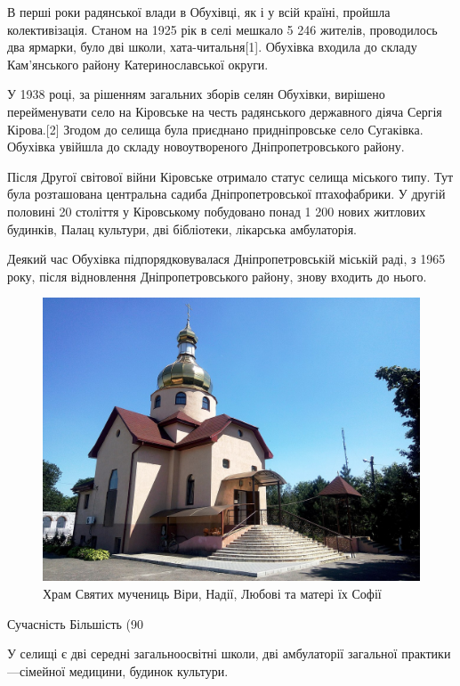В перші роки радянської влади в Обухівці, як і у всій країні, пройшла колективізація. Станом на 1925 рік в селі мешкало 5 246 жителів, проводилось два ярмарки, було дві школи, хата-читальня[1]. Обухівка входила до складу Кам'янського району Катеринославської округи.

У 1938 році, за рішенням загальних зборів селян Обухівки, вирішено перейменувати село на Кіровське на честь радянського державного діяча Сергія Кірова.[2] Згодом до селища була приєднано придніпровське село Сугаківка. Обухівка увійшла до складу новоутвореного Дніпропетровського району.

Після Другої світової війни Кіровське отримало статус селища міського типу. Тут була розташована центральна садиба Дніпропетровської птахофабрики. У другій половині 20 століття у Кіровському побудовано понад 1 200 нових житлових будинків, Палац культури, дві бібліотеки, лікарська амбулаторія.

Деякий час Обухівка підпорядковувалася Дніпропетровській міській раді, з 1965 року, після відновлення Дніпропетровського району, знову входить до нього.

\begin{figure}[h]
	\centering
	\includegraphics[width=0.8\linewidth]{23}
	\caption{\label{fig:frog3}Храм Святих мучениць Віри, Надії, Любові та матері їх Софії}
	\label{fig:23}
\end{figure}

Сучасність
Більшість (90 %

У селищі є дві середні загальноосвітні школи, дві амбулаторії загальної практики—сімейної медицини, будинок культури.

